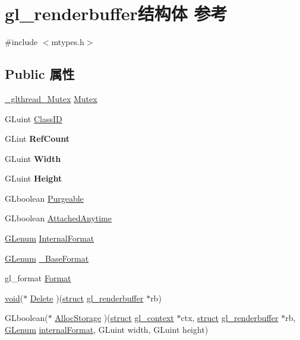 \hypertarget{structgl__renderbuffer}{}\section{gl\+\_\+renderbuffer结构体 参考}
\label{structgl__renderbuffer}


{\ttfamily \#include $<$mtypes.\+h$>$}

\subsection*{Public 属性}
\begin{DoxyCompactItemize}
\item 
\hyperlink{struct___c_r_i_t_i_c_a_l___s_e_c_t_i_o_n}{\+\_\+glthread\+\_\+\+Mutex} \hyperlink{structgl__renderbuffer_a279c62ac954364ce78084a5434829cc2}{Mutex}
\item 
G\+Luint \hyperlink{structgl__renderbuffer_a304a3efe4c9475c420b63315d1efc34a}{Class\+ID}
\item 
\mbox{\label{structgl__renderbuffer_a8e56c0006e0808ed690bfc88c2581618}} 
G\+Lint {\bfseries Ref\+Count}
\item 
\mbox{\label{structgl__renderbuffer_aee60dc8feece507e4f9257a3b40f8cc5}} 
G\+Luint {\bfseries Width}
\item 
\mbox{\label{structgl__renderbuffer_af439381abd5e4eb6d5b2373e43200a05}} 
G\+Luint {\bfseries Height}
\item 
G\+Lboolean \hyperlink{structgl__renderbuffer_af109a1d51c0b1b78925b6381ce162abb}{Purgeable}
\item 
G\+Lboolean \hyperlink{structgl__renderbuffer_a96d9b2ec2725f6ef30b097c7771fe89c}{Attached\+Anytime}
\item 
\hyperlink{interfacevoid}{G\+Lenum} \hyperlink{structgl__renderbuffer_a0fa7646bd3fafdda50aa039989b6c1ad}{Internal\+Format}
\item 
\hyperlink{interfacevoid}{G\+Lenum} \hyperlink{structgl__renderbuffer_a01b2be097f81607c3e646ffda0a2c961}{\+\_\+\+Base\+Format}
\item 
gl\+\_\+format \hyperlink{structgl__renderbuffer_ab9941ec9f6de54b2fd2a53439aa9a157}{Format}
\item 
\hyperlink{interfacevoid}{void}($\ast$ \hyperlink{structgl__renderbuffer_adbc4d0dd7d8bc7d4937c19309fb32937}{Delete} )(\hyperlink{interfacestruct}{struct} \hyperlink{structgl__renderbuffer}{gl\+\_\+renderbuffer} $\ast$rb)
\item 
G\+Lboolean($\ast$ \hyperlink{structgl__renderbuffer_a0f2ab4bf0d4e3343c76e67b0305b7f93}{Alloc\+Storage} )(\hyperlink{interfacestruct}{struct} \hyperlink{structgl__context}{gl\+\_\+context} $\ast$ctx, \hyperlink{interfacestruct}{struct} \hyperlink{structgl__renderbuffer}{gl\+\_\+renderbuffer} $\ast$rb, \hyperlink{interfacevoid}{G\+Lenum} \hyperlink{interfacevoid}{internal\+Format}, G\+Luint width, G\+Luint height)
\end{DoxyCompactItemize}


